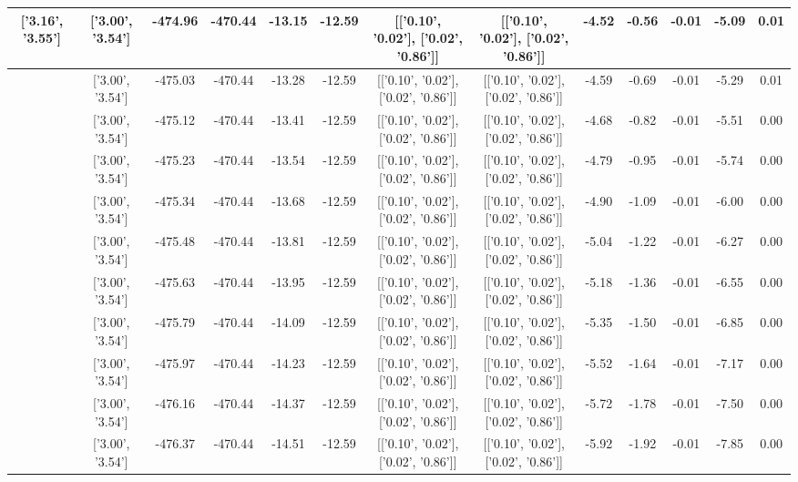 \begin{table}[htbp]
\begin{adjustbox}{angle=90}
\begin{tabular}{|c|c|c|c|c|c|c|c|c|c|c|c|c|}
 ['3.16', '3.55'] & ['3.00', '3.54'] & -474.96 & -470.44 & -13.15 & -12.59 & [['0.10', '0.02'], ['0.02', '0.86']] & [['0.10', '0.02'], ['0.02', '0.86']] & -4.52 & -0.56 & -0.01 & -5.09 & 0.01\\ \hline
 ['3.20', '3.55'] & ['3.00', '3.54'] & -475.03 & -470.44 & -13.28 & -12.59 & [['0.10', '0.02'], ['0.02', '0.86']] & [['0.10', '0.02'], ['0.02', '0.86']] & -4.59 & -0.69 & -0.01 & -5.29 & 0.01\\ \hline
 ['3.24', '3.56'] & ['3.00', '3.54'] & -475.12 & -470.44 & -13.41 & -12.59 & [['0.10', '0.02'], ['0.02', '0.86']] & [['0.10', '0.02'], ['0.02', '0.86']] & -4.68 & -0.82 & -0.01 & -5.51 & 0.00\\ \hline
 ['3.28', '3.56'] & ['3.00', '3.54'] & -475.23 & -470.44 & -13.54 & -12.59 & [['0.10', '0.02'], ['0.02', '0.86']] & [['0.10', '0.02'], ['0.02', '0.86']] & -4.79 & -0.95 & -0.01 & -5.74 & 0.00\\ \hline
 ['3.32', '3.56'] & ['3.00', '3.54'] & -475.34 & -470.44 & -13.68 & -12.59 & [['0.10', '0.02'], ['0.02', '0.86']] & [['0.10', '0.02'], ['0.02', '0.86']] & -4.90 & -1.09 & -0.01 & -6.00 & 0.00\\ \hline
 ['3.35', '3.56'] & ['3.00', '3.54'] & -475.48 & -470.44 & -13.81 & -12.59 & [['0.10', '0.02'], ['0.02', '0.86']] & [['0.10', '0.02'], ['0.02', '0.86']] & -5.04 & -1.22 & -0.01 & -6.27 & 0.00\\ \hline
 ['3.39', '3.57'] & ['3.00', '3.54'] & -475.63 & -470.44 & -13.95 & -12.59 & [['0.10', '0.02'], ['0.02', '0.86']] & [['0.10', '0.02'], ['0.02', '0.86']] & -5.18 & -1.36 & -0.01 & -6.55 & 0.00\\ \hline
 ['3.43', '3.57'] & ['3.00', '3.54'] & -475.79 & -470.44 & -14.09 & -12.59 & [['0.10', '0.02'], ['0.02', '0.86']] & [['0.10', '0.02'], ['0.02', '0.86']] & -5.35 & -1.50 & -0.01 & -6.85 & 0.00\\ \hline
 ['3.47', '3.57'] & ['3.00', '3.54'] & -475.97 & -470.44 & -14.23 & -12.59 & [['0.10', '0.02'], ['0.02', '0.86']] & [['0.10', '0.02'], ['0.02', '0.86']] & -5.52 & -1.64 & -0.01 & -7.17 & 0.00\\ \hline
 ['3.51', '3.57'] & ['3.00', '3.54'] & -476.16 & -470.44 & -14.37 & -12.59 & [['0.10', '0.02'], ['0.02', '0.86']] & [['0.10', '0.02'], ['0.02', '0.86']] & -5.72 & -1.78 & -0.01 & -7.50 & 0.00\\ \hline
 ['3.54', '3.58'] & ['3.00', '3.54'] & -476.37 & -470.44 & -14.51 & -12.59 & [['0.10', '0.02'], ['0.02', '0.86']] & [['0.10', '0.02'], ['0.02', '0.86']] & -5.92 & -1.92 & -0.01 & -7.85 & 0.00\\ \hline

\end{tabular}
\end{adjustbox}
\end{table}

